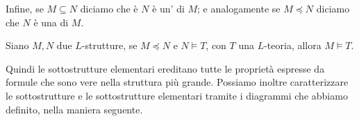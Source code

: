 \begin{definition}
    Infine, se $M \subseteq N$ diciamo che è $N$ è un' di $M$; e analogamente se $M \preceq N$ diciamo che $N$ è una  di $M$.
\end{definition}

\begin{remark}
    Siano $M,N$ due $L$-strutture, se $M \preceq N$ e $N \models T$, con $T$ una $L$-teoria, allora $M \models T$. 
\end{remark}

Quindi le sottostrutture elementari ereditano tutte le proprietà espresse da formule che sono vere nella struttura più grande. Possiamo inoltre caratterizzare le sottostrutture e le sottostrutture elementari tramite i diagrammi
che abbiamo definito, nella maniera seguente.

\pagebreak

